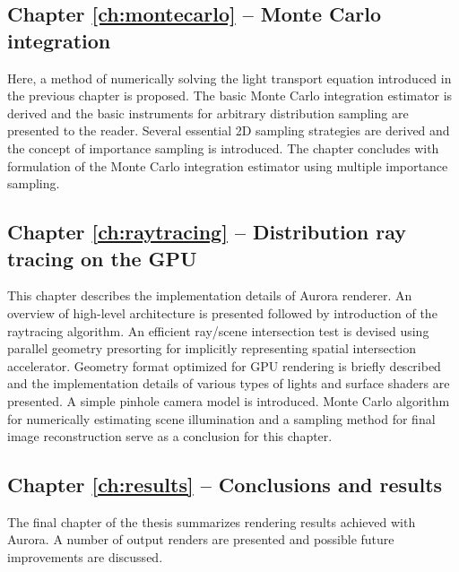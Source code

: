 \subsection{Chapter \ref{ch:montecarlo} -- Monte Carlo integration}
Here, a method of numerically solving the light transport equation introduced in the previous chapter is proposed. The basic Monte Carlo integration estimator is derived and the basic instruments for arbitrary distribution sampling are presented to the reader. Several essential 2D sampling strategies are derived and the concept of importance sampling is introduced. The chapter concludes with formulation of the Monte Carlo integration estimator using multiple importance sampling.

\subsection{Chapter \ref{ch:raytracing} -- Distribution ray tracing on the GPU}
This chapter describes the implementation details of Aurora renderer. An overview of high-level architecture is presented followed by introduction of the raytracing algorithm. An efficient ray/scene intersection test is devised using parallel geometry presorting for implicitly representing spatial intersection accelerator. Geometry format optimized for GPU rendering is briefly described and the implementation details of various types of lights and surface shaders are presented. A simple pinhole camera model is introduced. Monte Carlo algorithm for numerically estimating scene illumination and a sampling method for final image reconstruction serve as a conclusion for this chapter.

\subsection{Chapter \ref{ch:results} -- Conclusions and results}
The final chapter of the thesis summarizes rendering results achieved with Aurora. A number of output renders are presented and possible future improvements are discussed.



